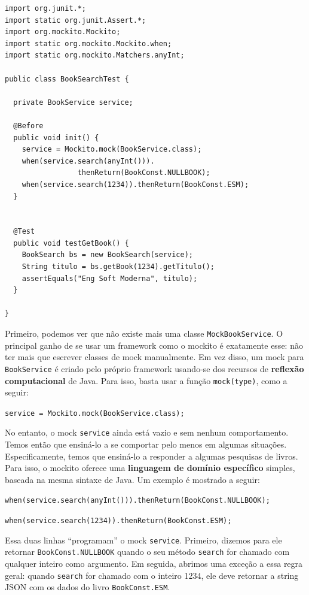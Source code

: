 \documentclass[
  11pt,
  twoside]{book}
\newcommand{\passthrough}[1]{#1}
\begin{document}
\begin{lstlisting}
import org.junit.*;
import static org.junit.Assert.*;
import org.mockito.Mockito;
import static org.mockito.Mockito.when;
import static org.mockito.Matchers.anyInt;

public class BookSearchTest {

  private BookService service;

  @Before
  public void init() {
    service = Mockito.mock(BookService.class);
    when(service.search(anyInt())).
                 thenReturn(BookConst.NULLBOOK);
    when(service.search(1234)).thenReturn(BookConst.ESM);
  }        


  @Test
  public void testGetBook() {
    BookSearch bs = new BookSearch(service);
    String titulo = bs.getBook(1234).getTitulo();
    assertEquals("Eng Soft Moderna", titulo);
  }

}
\end{lstlisting}

Primeiro, podemos ver que não existe mais uma classe
\passthrough{\lstinline!MockBookService!}. O principal ganho de se usar
um framework como o mockito é exatamente esse: não ter mais que escrever
classes de mock manualmente. Em vez disso, um mock para
\passthrough{\lstinline!BookService!} é criado pelo próprio framework
usando-se dos recursos de \textbf{reflexão computacional} de Java. Para
isso, basta usar a função \passthrough{\lstinline!mock(type)!}, como a
seguir:

\passthrough{\lstinline!service = Mockito.mock(BookService.class);!}

No entanto, o mock \passthrough{\lstinline!service!} ainda está vazio e
sem nenhum comportamento. Temos então que ensiná-lo a se comportar pelo
menos em algumas situações. Especificamente, temos que ensiná-lo a
responder a algumas pesquisas de livros. Para isso, o mockito oferece
uma \textbf{linguagem de domínio específico} simples, baseada na mesma
sintaxe de Java. Um exemplo é mostrado a seguir:

\passthrough{\lstinline!when(service.search(anyInt())).thenReturn(BookConst.NULLBOOK);!}

\passthrough{\lstinline!when(service.search(1234)).thenReturn(BookConst.ESM);!}

Essa duas linhas ``programam'' o mock \passthrough{\lstinline!service!}.
Primeiro, dizemos para ele retornar
\passthrough{\lstinline!BookConst.NULLBOOK!} quando o seu método
\passthrough{\lstinline!search!} for chamado com qualquer inteiro como
argumento. Em seguida, abrimos uma exceção a essa regra geral: quando
\passthrough{\lstinline!search!} for chamado com o inteiro 1234, ele
deve retornar a string JSON com os dados do livro
\passthrough{\lstinline!BookConst.ESM!}.
\end{document}
